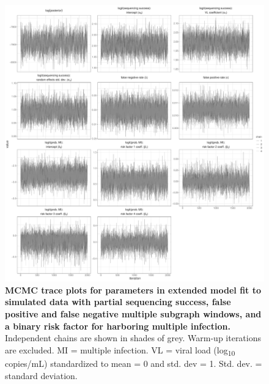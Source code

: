 \documentclass[10pt,letterpaper]{article}
\begin{document}
\begin{figure}[!ht]
 \includegraphics[width=1\textwidth]{../../figures/extended_simulation_extended_trace.pdf}
\caption{{\bf MCMC trace plots for parameters in extended model fit to simulated data with partial sequencing success, false positive and false negative multiple subgraph windows, and a binary risk factor for harboring multiple infection.} Independent chains are shown in shades of grey. Warm-up iterations are excluded. MI = multiple infection. VL = viral load (log\textsubscript{10} copies/mL) standardized to mean = 0 and std. dev = 1. Std. dev. = standard deviation.  }
\end{figure}
\end{document}
